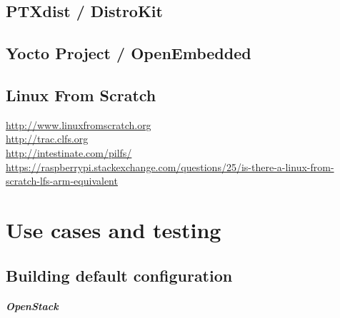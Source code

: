 \documentclass[printmode]{mgr}
\begin{document}
\section{PTXdist / DistroKit}




\section{Yocto Project / OpenEmbedded}

\section{Linux From Scratch}

\url{http://www.linuxfromscratch.org}\\
\url{http://trac.clfs.org}\\
\url{http://intestinate.com/pilfs/}\\
\url{https://raspberrypi.stackexchange.com/questions/25/is-there-a-linux-from-scratch-lfs-arm-equivalent}

\chapter{Use cases and testing}
\label{chapter:software}

\section{Building default configuration}




\paragraph{OpenStack}
\end{document}
